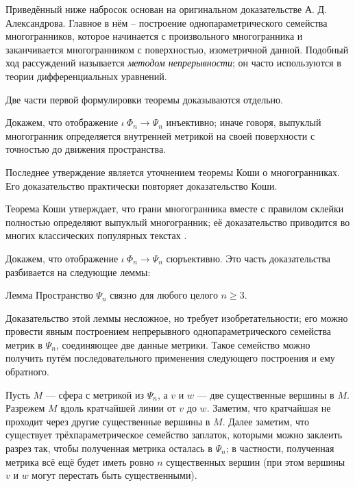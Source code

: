 \documentclass[oneside,a4paper]{article}
\begin{document}
Приведённый ниже набросок основан на оригинальном доказательстве А. Д. Александрова.
Главное в нём -- построение однопараметрического семейства многогранников, которое начинается с произвольного многогранника и заканчивается многогранником с поверхностью, изометричной данной.  
Подобный ход рассуждений называется \emph{методом непрерывности};
он часто используются в теории дифференциальных уравнений.

\medskip

Две части первой формулировки теоремы доказываются отдельно.

 Докажем, что отображение $\iota\:\Phi_n\to\Psi_n$ инъективно; иначе говоря, выпуклый многогранник определяется внутренней метрикой на своей поверхности с точностью до движения пространства.

Последнее утверждение является уточнением теоремы Коши о многогранниках. 
Его доказательство практически повторяет доказательство Коши.

Теорема Коши утверждает, что грани многогранника вместе с правилом склейки полностью определяют выпуклый многогранник;
её доказательство приводится во многих классических популярных текстах \cite{aigner-zigler,dolbilin,tabacnikov-fuks}.

\medskip

 Докажем, что отображение $\iota\:\Phi_n\to\Psi_n$ сюръективно.
Это часть доказательства разбивается на следующие леммы:

\begin{thm}{Лемма}
Пространство $\Psi_n$ связно для любого целого $n\ge 3$.
\end{thm}

Доказательство этой леммы несложное, но требует изобретательности; 
его можно провести явным построением непрерывного однопараметрического семейства  метрик в $\Psi_n$, соединяющее две данные метрики.
Такое семейство можно получить путём последовательного применения следующего построения и ему обратного.

Пусть $M$ --- сфера с метрикой из $\Psi_n$, а $v$ и $w$ --- две существенные вершины в $M$.
Разрежем $M$ вдоль кратчайшей линии от $v$ до $w$. 
Заметим, что кратчайшая не проходит через другие существенные вершины в $M$.
Далее заметим, что существует трёхпараметрическое семейство заплаток, которыми можно заклеить разрез так, чтобы полученная метрика осталась в $\Psi_n$; 
в частности, полученная метрика всё ещё будет иметь ровно $n$ существенных вершин (при этом вершины $v$ и $w$ могут перестать быть существенными).
\end{document}
